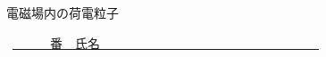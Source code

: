 \documentclass[a4paper,9pt]{jsarticle}
\begin{document}
\hakosyokika
\begin{center}
{\Large 電磁場内の荷電粒子}
\end{center}
\hfill ~\underline{~~~~~~番　氏名~~~~~~~~~~~~~~~~~~~~~~~~~~~~~~~~~~~}
\hakosyokika
\begin{enumerate}
\setcounter{enumi}{138}

\vfill

\vfill
\newpage

\vfill

\vfill
\newpage

\vfill

\vfill
\newpage

\vfill
\end{enumerate}
\end{document}
